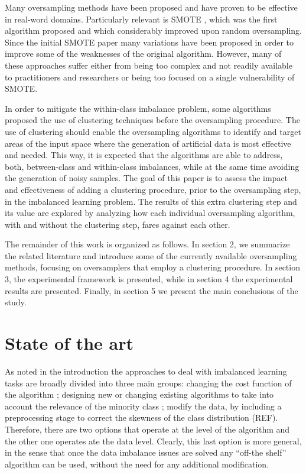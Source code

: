 \documentclass[parskip=full]{scrartcl}
\begin{document}
Many oversampling methods have been proposed and have proven to be effective in 
real-word domains. Particularly relevant is SMOTE \cite{Chawla2002}, which was 
the first algorithm  proposed and which considerably improved upon random 
oversampling. Since the initial SMOTE paper many variations have been proposed 
in order to improve some of the weaknesses of the original algorithm. However, 
many of these approaches suffer either from being too complex and not readily 
available to practitioners and researchers or being too focused on a single 
vulnerability of SMOTE.

In order to mitigate the within-class imbalance problem, some algorithms proposed the use of clustering techniques before the oversampling procedure. The use of clustering should enable the oversampling algorithms to identify and target areas of the input space where the generation of artificial data is most effective and needed. This way, it is expected that the algorithms are able to address, both, between-class and within-class imbalances, while at the same time avoiding the generation of noisy samples. The goal of this paper is to assess the impact and effectiveness of adding a clustering procedure, prior to the oversampling step, in the imbalanced learning problem. The results of this extra clustering step and its value are explored by analyzing how each individual oversampling algorithm, with and without the clustering step, fares against each other. 

The remainder of this work is organized as follows. In section 2, we summarize 
the related literature and introduce some of the currently available 
oversampling methods, focusing on oversamplers that employ a clustering 
procedure. In section 3, the experimental framework is presented, while in 
section 4 the experimental results are presented. Finally, in section 5 we 
present the main conclusions of the study.

\section{State of the art}

As noted in the introduction the approaches to deal with imbalanced learning 
tasks are broadly divided into three main groups: changing the cost function of 
the algorithm \cite{Wu2005}; designing new or changing existing algorithms to 
take into account the relevance of the minority class \cite{Chawla2008}; modify 
the data, by including a preprocessing stage to correct the skewness of the 
class distribution (REF). Therefore, there are two options that operate at the 
level of the algorithm and the other one operates ate the data level. Clearly, 
this last option is more general, in the sense that once the data imbalance 
issues are solved any “off-the shelf” algorithm can be used, without the need 
for any additional 
modification. 
\end{document}
